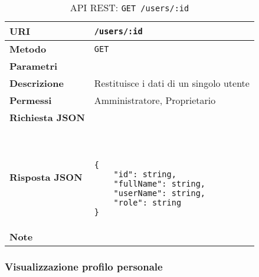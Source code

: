         \begin{table}[H]
            \begin{center}
                \begin{tabular}{p{} p{}}
                    \toprule
                    \textbf{URI} & \texttt{/users/:id} \\ \midrule
                    \textbf{Metodo} & \texttt{GET} \\ \midrule
                    \textbf{Parametri} & \\ \midrule
                    \textbf{Descrizione} & Restituisce i dati di un singolo utente \\ \midrule
                    \textbf{Permessi} & Amministratore, Proprietario  \\ \midrule
                    \textbf{Richiesta JSON} & \\ \midrule
                    \textbf{Risposta JSON} & \
                        \begin{lstlisting}[basicstyle={\ttfamily}]
{
    "id": string,
    "fullName": string,
    "userName": string,
    "role": string
}
                        \end{lstlisting}
                        \\ \midrule
                    \textbf{Note} & \\
                    \bottomrule
                \end{tabular}
                \caption{API REST: \texttt{GET /users/:id}}
            \end{center}
        \end{table}

    \subsubsection{Visualizzazione profilo personale}

